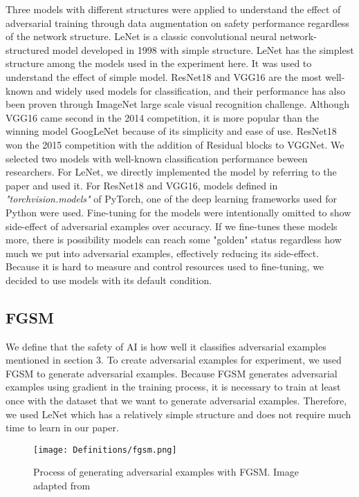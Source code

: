 \documentclass[symmetry,article,submit,moreauthors,pdftex]{Definitions/mdpi}
\begin{document}
Three models with different structures were applied to understand the effect of adversarial training through data augmentation on safety performance regardless of the network structure.
LeNet\cite{lenet} is a classic convolutional neural network-structured model developed in 1998 with simple structure.
LeNet has the simplest structure among the models used in the experiment here. It was used to understand the effect of simple model.
ResNet18\cite{resnet} and VGG16\cite{vgg} are the most well-known and widely used models for classification, and their performance has also been proven through ImageNet large scale visual recognition challenge.
Although VGG16 came second in the 2014 competition, it is more popular than the winning model GoogLeNet because of its simplicity and ease of use.
ResNet18 won the 2015 competition with the addition of Residual blocks to VGGNet.
We selected two models with well-known classification performance beween researchers.
For LeNet, we directly implemented the model by referring to the paper and used it.
For ResNet18 and VGG16, models defined in {\it "torchvision.models"} of PyTorch\cite{pytorch}, one of the deep learning frameworks used for Python were used.
Fine-tuning for the models were intentionally omitted to show side-effect of adversarial examples over accuracy. If we fine-tunes these models more, there is possibility models can reach some "golden" status regardless how much we put into adversarial examples, effectively reducing its side-effect. Because it is hard to measure and control resources used to fine-tuning, we decided to use models with its default condition.

\subsection{FGSM}

We define that the safety of AI is how well it classifies adversarial examples mentioned in section 3.
To create adversarial examples for experiment, we used FGSM \cite{adversarial-goodfellow} to generate adversarial examples. Because FGSM generates adversarial examples using gradient in the training process, it is necessary to train at least once with the dataset that we want to generate adversarial examples.
Therefore, we used LeNet which has a relatively simple structure and does not require much time to learn in our paper.

\begin{figure}[H] 
\texttt{[image: Definitions/fgsm.png]}
\caption{Process of generating adversarial examples with FGSM. Image adapted from \cite{adversarial-goodfellow}\label{fgsm}}
\end{figure} 
\end{document}

